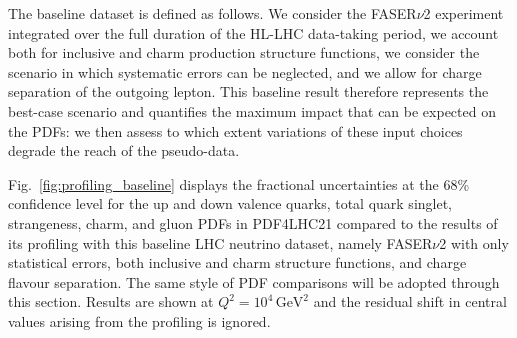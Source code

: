 %
The baseline dataset is defined as follows.
%
We consider the FASER$\nu$2 experiment integrated over the full duration of the HL-LHC data-taking period,
we account both for inclusive and charm production structure functions, we consider the scenario
in which systematic errors can be neglected, and we allow for charge separation of the outgoing lepton.
%
This baseline result therefore represents the best-case scenario and quantifies the maximum impact that can be expected
on the PDFs: we then assess to which extent variations of these input choices degrade the reach of the pseudo-data.

Fig.~\ref{fig:profiling_baseline} displays the fractional uncertainties at the 68\% confidence level
for the up and down valence quarks, total quark singlet, strangeness, charm, and gluon PDFs
in PDF4LHC21 compared to the results of its profiling with this baseline LHC neutrino dataset, namely
FASER$\nu$2 with only statistical errors, both inclusive and charm structure functions,  and charge flavour
separation.
%
The same style of PDF comparisons will be adopted through this section.
%
Results are shown at $Q^2 = 10^4 \, \textrm{GeV}^2$ and the residual shift in central values
arising from the profiling is ignored.

